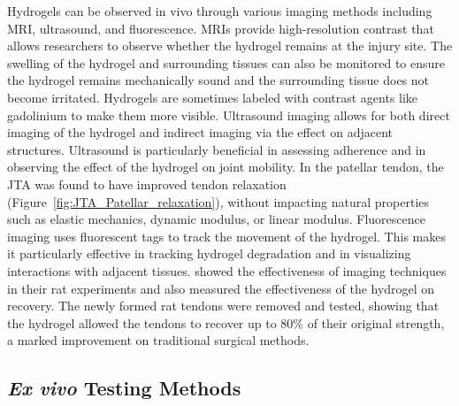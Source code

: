 Hydrogels can be observed in vivo through various imaging methods including MRI, ultrasound,
and fluorescence. MRIs provide high-resolution contrast that allows researchers to observe
whether the hydrogel remains at the injury site. The swelling of the hydrogel and surrounding
tissues can also be monitored to ensure the hydrogel remains mechanically sound and the
surrounding tissue does not become irritated. Hydrogels are sometimes labeled with contrast
agents like gadolinium to make them more visible. Ultrasound imaging allows for both direct
imaging of the hydrogel and indirect imaging via the effect on adjacent structures. Ultrasound is
particularly beneficial in assessing adherence and in observing the effect of the hydrogel on joint
mobility. In the patellar tendon, the JTA was found to have improved tendon relaxation (Figure~\ref{fig:JTA_Patellar_relaxation}), without impacting natural properties such as elastic mechanics, dynamic modulus, or linear modulus. Fluorescence imaging uses fluorescent tags to track the movement of the hydrogel.
This makes it particularly effective in tracking hydrogel degradation and in visualizing
interactions with adjacent tissues. \citeauthor{freedmanEnhancedTendonHealing2022} showed the effectiveness of imaging
techniques in their rat experiments and also measured the effectiveness of the hydrogel on
recovery. The newly formed rat tendons were removed and tested, showing that the hydrogel
allowed the tendons to recover up to 80\% of their original strength, a marked improvement on
traditional surgical methods.

\subsection{\textit{Ex vivo} Testing Methods}

